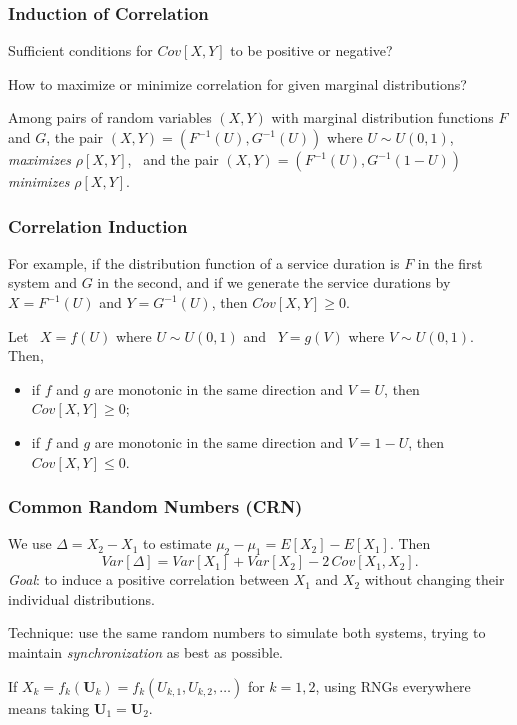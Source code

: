 \documentclass[t,usepdftitle=false]{beamer}
\def\bU{\boldsymbol{U}}
\begin{document}
\begin{frame}
	\frametitle{Induction of Correlation}
	
	Sufficient conditions for $Cov[X,Y]$ 
	to be positive or negative?
	
	\mbox{}
	
	How to maximize or minimize correlation for given marginal distributions?
	
	\mbox{}
	
	\begin{theorem}
		Among pairs of random variables $(X,Y)$ with marginal 
		distribution functions $F$ and $G$, the pair $(X,Y) = (F^{-1}(U), G^{-1}(U))$ 
		where $U \sim U(0,1)$, \emph{maximizes} $\rho[X, Y]$, \
		and the pair $(X,Y) = (F^{-1}(U), G^{-1}(1-U))$
		\emph{minimizes} $\rho[X, Y]$.
	\end{theorem}
	
\end{frame}

\begin{frame}
	\frametitle{Correlation Induction}
	
	For example, if the distribution function of a service duration is 
	${F}$ in the first system and ${G}$ in the second,
	and if we generate the service durations by
	$X = F^{-1}(U)$ and $Y = G^{-1}(U)$, then $Cov[X, Y] \ge 0$.
	
	\begin{theorem}
		Let \ ${X} = {f}(U)$ where ${U} \sim U(0,1)$ and \
		${Y} = {g}(V)$ where ${V} \sim U(0,1)$. Then,
		\begin{itemize}
			\item
			if $f$ and $g$ are monotonic in the same direction and $V=U$,
			then $Cov[X, Y] \ge 0$;
			\item
			if $f$ and $g$ are monotonic in the same direction and $V=1-U$,
			then $Cov[X, Y] \le 0$.
		\end{itemize}
	\end{theorem}
	
\end{frame}

\begin{frame}
	\frametitle{Common Random Numbers (CRN)}
	
	We use ${\Delta} = {X_2}-{X_1}$ to estimate ${\mu_2}-{\mu_1} = E[X_2] - E[X_1]$.
	Then
	\[
	Var[\Delta] = Var[X_1] + Var[X_2] - 2 \, Cov[X_1,X_2].
	\]
	\emph{Goal}: to induce a positive correlation between $X_1$ and $X_2$
	without changing their individual distributions.
	
	\mbox{}
	
	Technique: use the same random numbers to simulate
	both systems, trying to maintain \emph{synchronization}
	as best as possible.
	
	\mbox{}
	
	If $X_k = {f_k}(\bU_k) = f_k({U_{k,1}},{U_{k,2}},\dots)$ 
	for $k=1,2$, using RNGs everywhere means taking $\bU_1=\bU_2$.
	
\end{frame}
\end{document}
